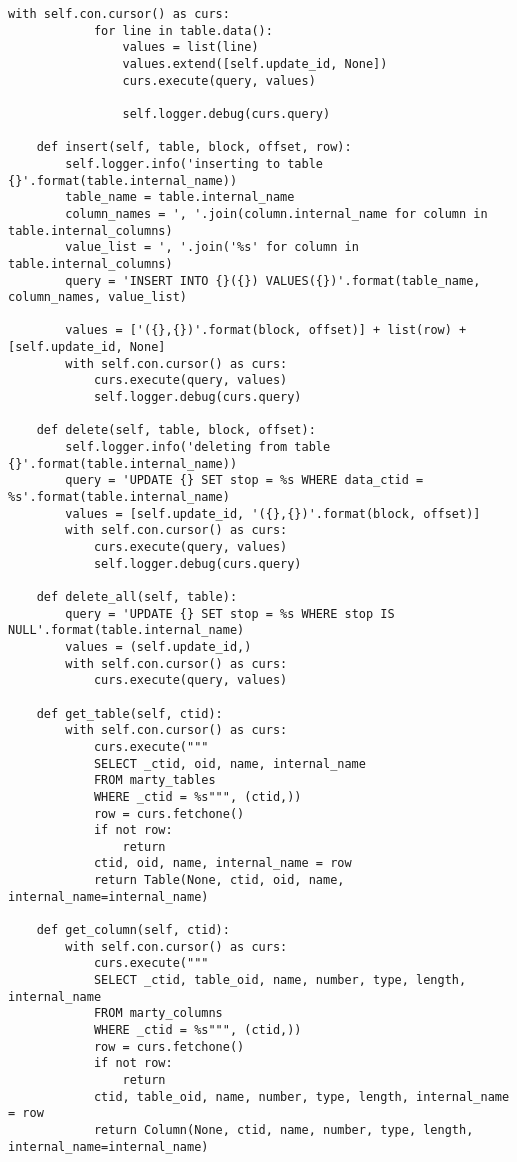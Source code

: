 \begin{lstlisting}[caption={utils/populator.py}]
        with self.con.cursor() as curs:
            for line in table.data():
                values = list(line)
                values.extend([self.update_id, None])
                curs.execute(query, values)

                self.logger.debug(curs.query)

    def insert(self, table, block, offset, row):
        self.logger.info('inserting to table {}'.format(table.internal_name))
        table_name = table.internal_name
        column_names = ', '.join(column.internal_name for column in table.internal_columns)
        value_list = ', '.join('%s' for column in table.internal_columns)
        query = 'INSERT INTO {}({}) VALUES({})'.format(table_name, column_names, value_list)

        values = ['({},{})'.format(block, offset)] + list(row) + [self.update_id, None]
        with self.con.cursor() as curs:
            curs.execute(query, values)
            self.logger.debug(curs.query)

    def delete(self, table, block, offset):
        self.logger.info('deleting from table {}'.format(table.internal_name))
        query = 'UPDATE {} SET stop = %s WHERE data_ctid = %s'.format(table.internal_name)
        values = [self.update_id, '({},{})'.format(block, offset)]
        with self.con.cursor() as curs:
            curs.execute(query, values)
            self.logger.debug(curs.query)

    def delete_all(self, table):
        query = 'UPDATE {} SET stop = %s WHERE stop IS NULL'.format(table.internal_name)
        values = (self.update_id,)
        with self.con.cursor() as curs:
            curs.execute(query, values)

    def get_table(self, ctid):
        with self.con.cursor() as curs:
            curs.execute("""
            SELECT _ctid, oid, name, internal_name
            FROM marty_tables
            WHERE _ctid = %s""", (ctid,))
            row = curs.fetchone()
            if not row:
                return
            ctid, oid, name, internal_name = row
            return Table(None, ctid, oid, name, internal_name=internal_name)

    def get_column(self, ctid):
        with self.con.cursor() as curs:
            curs.execute("""
            SELECT _ctid, table_oid, name, number, type, length, internal_name
            FROM marty_columns
            WHERE _ctid = %s""", (ctid,))
            row = curs.fetchone()
            if not row:
                return
            ctid, table_oid, name, number, type, length, internal_name = row
            return Column(None, ctid, name, number, type, length, internal_name=internal_name)



\end{lstlisting}
